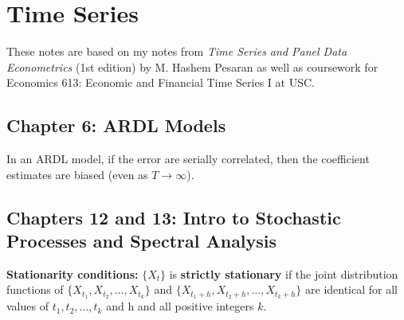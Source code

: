 %
%
%
%
%
%
%
%
%
%
%
%
%

\section{Time Series}

These notes are based on my notes from \textit{Time Series and Panel Data Econometrics} (1st edition) by M. Hashem Pesaran \citep{pesaran-2015-text} as well as coursework for Economics 613: Economic and Financial Time Series I at USC.

\subsection{Chapter 6: ARDL Models}

In an ARDL model, if the error are serially correlated, then the coefficient estimates are biased (even as \(T \to \infty\)).


\subsection{Chapters 12 and 13: Intro to Stochastic Processes and Spectral Analysis}

\textbf{Stationarity conditions:} \( \{X_t\} \) is \textbf{strictly stationary} if the joint distribution functions of \( \{ X_{t_1}, X_{t_2}, \ldots, X_{t_k}\} \) and \( \{ X_{t_1+h}, X_{t_2+h}, \ldots, X_{t_k+h}\} \) are identical for all values of \(t_1,  t_2, \ldots, t_k\) and h and all positive integers \(k\). 

